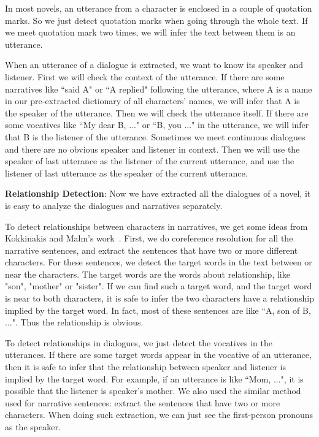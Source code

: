\documentclass[11pt]{article}
\begin{document}
In most novels, an utterance from a character is enclosed in a couple of quotation marks. So we just detect quotation marks when going through the whole text. If we meet quotation mark two times, we will infer the text between them is an utterance.

When an utterance of a dialogue is extracted, we want to know its speaker and listener. First we will check the context of the utterance. If there are some narratives like ``said A" or ``A replied" following the utterance, where A is a name in our pre-extracted dictionary of all characters' names, we will infer that A is the speaker of the utterance. Then we will check the utterance itself. If there are some vocatives like ``My dear B, ..." or ``B, you ..." in the utterance, we will infer that B is the listener of the utterance. Sometimes we meet continuous dialogues and there are no obvious speaker and listener in context. Then we will use the speaker of last utterance as the listener of the current utterance, and use the listener of last utterance as the speaker of the current utterance. 

{\bf Relationship Detection}: Now we have extracted all the dialogues of a novel, it is easy to analyze the dialogues and narratives separately. 

To detect relationships between characters in narratives, we get some ideas from Kokkinakis and Malm's work~\cite{kokkinakis-malm-2011-character}. First, we do coreference resolution for all the narrative sentences, and extract the sentences that have two or more different characters. For these sentences, we detect the target words in the text between or near the characters. The target words are the words about relationship, like "son", "mother" or "sister". If we can find such a target word, and the target word is near to both characters, it is safe to infer the two characters have a relationship implied by the target word. In fact, most of these sentences are like ``A, son of B, ...". Thus the relationship is obvious.

To detect relationships in dialogues, we just detect the vocatives in the utterances. If there are some target words appear in the vocative of an utterance, then it is safe to infer that the relationship between speaker and listener is implied by the target word. For example, if an utterance is like ``Mom, ...", it is possible that the listener is speaker's mother. We also used the similar method used for narrative sentences: extract the sentences that have two or more characters. When doing such extraction, we can just see the first-person pronouns as the speaker.
\end{document}
